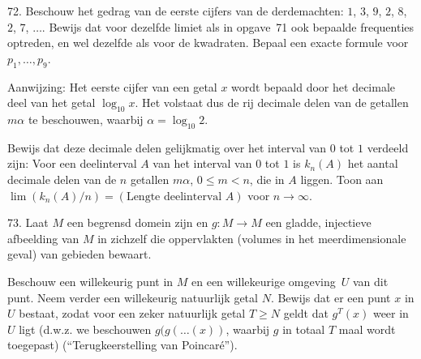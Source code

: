 \begin{problem}{72.}
	Beschouw het gedrag van de eerste cijfers van de derdemachten: $1$, $3$, $9$, $2$, $8$, $2$, $7$, $\dotsc$. Bewijs dat voor dezelfde limiet als in opgave~71 ook bepaalde frequenties optreden, en wel dezelfde als voor de kwa\-draten. Bepaal een exacte formule voor $p_1, \dotsc, p_9$.
\\
	\begin{note}{Aanwijzing:}
		Het eerste cijfer van een getal $x$ wordt bepaald door het decimale deel van het getal $\log_{10} x$. Het volstaat dus de rij decimale delen van de getallen $m \alpha$ te beschouwen, waarbij $\alpha = \log_{10} 2$.
	\end{note}
	Bewijs dat deze decimale delen gelijkmatig over het interval van $0$ tot $1$ verdeeld zijn: Voor een deelinterval $A$ van het interval van $0$ tot $1$ is $k_n(A)$ het aantal decimale delen van de $n$ getallen $m \alpha$, $0 \leqslant m < n$, die in $A$ liggen. Toon aan $\lim(k_n(A)/n)=(\text{Lengte deelinterval $A$})$ voor $n \rightarrow \infty$.
\end{problem}

\begin{problem}{73.}
	Laat $M$ een begrensd domein zijn en $g\colon M \to M$ een gladde, injectieve afbeelding van $M$ in zichzelf die oppervlakten (volumes in het meerdimensionale geval) van gebieden bewaart.

	Beschouw een willekeurig punt in $M$ en een willekeurige omge\-ving~$U$ van dit punt. Neem verder een willekeurig natuurlijk getal $N$. Bewijs dat er een punt $x$ in $U$ bestaat, zodat voor een zeker natuurlijk getal $T\geq N$ geldt dat $g^T (x)$ weer in $U$ ligt (d.w.z. we beschouwen $g(g(\dots (x))$, waarbij $g$ in totaal $T$ maal wordt toegepast) (\enquote{Terugkeer\-stelling van Poincaré}).
\end{problem}

